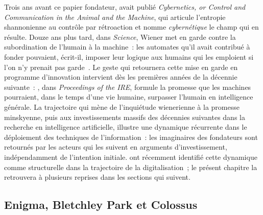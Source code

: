 %
Trois ans avant ce papier fondateur, \textcite{wiener_cybernetics_1948} avait publié \emph{Cybernetics, or Control and Communication in the Animal and the Machine}, qui articule l'entropie shannonienne au contrôle par rétroaction et nomme \emph{cybernétique} le champ qui en résulte. Douze ans plus tard, dans \emph{Science}, Wiener met en garde contre la subordination de l'humain à la machine~: les automates qu'il avait contribué à fonder pouvaient, écrit-il, imposer leur logique aux humains qui les emploient si l'on n'y prenait pas garde~\parencite{wiener_consequences_1960}. Le geste qui retournera cette mise en garde en programme d'innovation intervient dès les premières années de la décennie suivante~: \textcite{minsky_steps_1961}, dans \emph{Proceedings of the IRE}, formule la promesse que les machines pourraient, dans le temps d'une vie humaine, surpasser l'humain en intelligence générale. La trajectoire qui mène de l'inquiétude wienerienne à la promesse minskyenne, puis aux investissements massifs des décennies suivantes dans la recherche en intelligence artificielle, illustre une dynamique récurrente dans le déploiement des techniques de l'information~: les imaginaires des fondateurs sont retournés par les acteurs qui les suivent en arguments d'investissement, indépendamment de l'intention initiale. \textcite{johnstone_deep_2026} ont récemment identifié cette dynamique comme structurelle dans la trajectoire de la digitalisation~; le présent chapitre la retrouvera à plusieurs reprises dans les sections qui suivent.


\subsection{Enigma, Bletchley Park et Colossus}\label{subsec:enigma}

